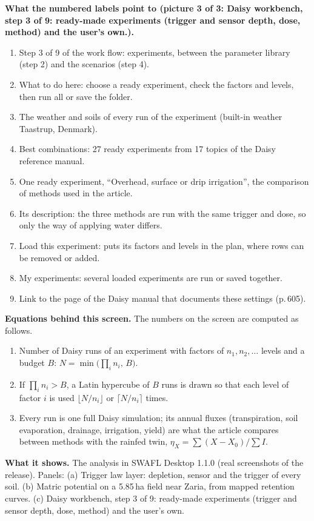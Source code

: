 \textbf{What the numbered labels point to (picture 3 of 3: Daisy workbench, step 3 of 9: ready-made experiments (trigger and sensor depth, dose, method) and the user's own.).}
\begin{enumerate}[nosep,label=\protect\circled{\arabic*}]
\item Step 3 of 9 of the work flow: experiments, between the parameter library (step 2) and the scenarios (step 4).
\item What to do here: choose a ready experiment, check the factors and levels, then run all or save the folder.
\item The weather and soils of every run of the experiment (built-in weather Taastrup, Denmark).
\item Best combinations: 27 ready experiments from 17 topics of the Daisy reference manual.
\item One ready experiment, ``Overhead, surface or drip irrigation'', the comparison of methods used in the article.
\item Its description: the three methods are run with the same trigger and dose, so only the way of applying water differs.
\item Load this experiment: puts its factors and levels in the plan, where rows can be removed or added.
\item My experiments: several loaded experiments are run or saved together.
\item Link to the page of the Daisy manual that documents these settings (p.\,605).
\end{enumerate}

\textbf{Equations behind this screen.} The numbers on the screen are computed as follows.
\begin{enumerate}[nosep,label=(\roman*)]
\item Number of Daisy runs of an experiment with factors of $n_1,n_2,\dots$ levels and a budget $B$: $N=\min\bigl(\prod_i n_i,\,B\bigr)$.
\item If $\prod_in_i>B$, a Latin hypercube of $B$ runs is drawn so that each level of factor $i$ is used $\lfloor N/n_i\rfloor$ or $\lceil N/n_i\rceil$ times.
\item Every run is one full Daisy simulation; its annual fluxes (transpiration, soil evaporation, drainage, irrigation, yield) are what the article compares between methods with the rainfed twin, $\eta_X=\sum(X-X_0)/\sum I$.
\end{enumerate}

\textbf{What it shows.} The analysis in SWAFL Desktop 1.1.0 (real screenshots of the release). Panels: (a) Trigger law layer: depletion, sensor and the trigger of every soil. (b) Matric potential on a 5.85\,ha field near Zaria, from mapped retention curves. (c) Daisy workbench, step 3 of 9: ready-made experiments (trigger and sensor depth, dose, method) and the user's own.

